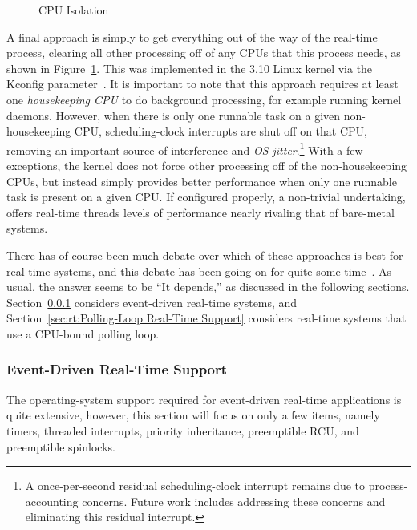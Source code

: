 \begin{figure}[tb]
\centering
{}
\caption{CPU Isolation}
\label{fig:rt:CPU Isolation}
\end{figure}

A final approach is simply to get everything out of the way of the
real-time process, clearing all other processing off of any CPUs that
this process needs, as shown in Figure~\ref{fig:rt:CPU Isolation}.
This was implemented in the 3.10 Linux kernel via the 
Kconfig parameter~\cite{FredericWeisbecker2013nohz}.
It is important to note that this approach requires at least one
\emph{housekeeping CPU} to do background processing, for example running
kernel daemons.
However, when there is only one runnable task on a given non-housekeeping CPU,
scheduling-clock interrupts are shut off on that CPU, removing an important
source of interference and \emph{OS jitter}.\footnote{
	A once-per-second residual scheduling-clock interrupt remains
	due to process-accounting concerns.
	Future work includes addressing these concerns and eliminating
	this residual interrupt.}
With a few exceptions, the kernel does not force other processing off of the
non-housekeeping CPUs, but instead simply provides better performance
when only one runnable task is present on a given CPU.
If configured properly, a non-trivial undertaking, 
offers real-time threads levels of performance nearly rivaling that of
bare-metal systems.

There has of course been much debate over which of these approaches
is best for real-time systems, and this debate has been going on for
quite some
time~\cite{JonCorbet2004RealTimeLinuxPart1,JonCorbet2004RealTimeLinuxPart2}.
As usual, the answer seems to be ``It depends,'' as discussed in the
following sections.
Section~\ref{sec:rt:Event-Driven Real-Time Support}
considers event-driven real-time systems, and
Section~\ref{sec:rt:Polling-Loop Real-Time Support}
considers real-time systems that use a CPU-bound polling loop.

\subsubsection{Event-Driven Real-Time Support}
\label{sec:rt:Event-Driven Real-Time Support}

The operating-system support required for event-driven real-time
applications is quite extensive, however, this section will focus
on only a few items, namely
timers,
threaded interrupts,
priority inheritance,
preemptible RCU,
and
preemptible spinlocks.


